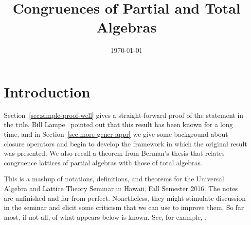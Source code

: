 
\usepackage{inputs/proof-dashed}



\usepackage{inputs/macros}

\usepackage[backend=bibtex]{biblatex}




\title{Congruences of Partial and Total Algebras}
\date{\today}


\maketitle


\section{Introduction}
\label{sec:introduction}
Section~\ref{sec:simple-proof-well} gives a straight-forward proof of the
statement in the title. Bill Lampe~\cite{Lampe:20161017} pointed out
that this result has been known for a long time, and in
Section~\ref{sec:more-gener-appr}
we give some background about closure operators and 
begin to develop the framework in which the original result was presented.
We also recall a theorem from Berman's thesis that relates congruence lattices of
partial algebras with those of total algebras.

This is a mashup of notations, definitions, and theorems
for the Universal Algebra and Lattice Theory Seminar
in Hawaii, Fall Semester 2016. 
The notes are unfinished and far from perfect.
Nonetheless, they might stimulate discussion
in the seminar and elicit some criticism
that we can use to improve them.
So far most, if not all, of what appears below is known.
See, for example, \cite{MR2619731, MR0308011, MR0237401, MR2455216}.


